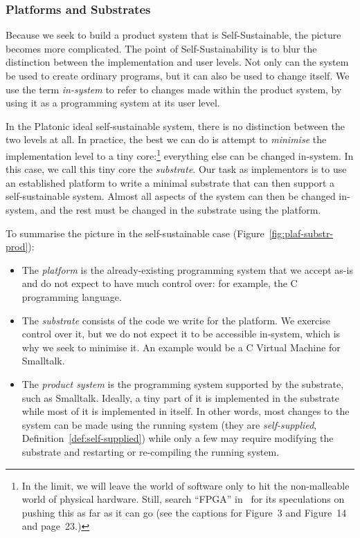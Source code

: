 \documentclass[ twoside,openright,titlepage,numbers=noenddot,headinclude,footinclude,cleardoublepage=empty,abstract=on,
                BCOR=5mm,paper=a4,fontsize=11pt
                ]{scrreprt}
\providecommand{\tightlist}{}\newenvironment{longtable}[2]{\begin{tabular}}{\end{tabular}}
\theoremstyle{definition}
\begin{document}
\hypertarget{platforms-and-substrates}{\subsubsection{Platforms and
Substrates}\label{platforms-and-substrates}}

Because we seek to build a product system that is Self-Sustainable, the
picture becomes more complicated. The point of Self-Sustainability is to
blur the distinction between the implementation and user levels. Not
only can the system be used to create ordinary programs, but it can also
be used to change itself. We use the term \emph{in-system} to refer to
changes made within the product system, by using it as a programming
system at its user level.

In the Platonic ideal self-sustainable system, there is no distinction
between the two levels at all. In practice, the best we can do is
attempt to \emph{minimise} the implementation level to a tiny
core:\footnote{In the limit, we will leave the world of software only to
  hit the non-malleable world of physical hardware. Still, search
  ``FPGA'' in~\parencite{COLAs} for its speculations on pushing this as
  far as it can go (see the captions for Figure~3 and Figure~14 and
  page~23.)} everything else can be changed in-system. In this case, we
call this tiny core the \emph{substrate}. Our task as implementors is to
use an established platform to write a minimal substrate that can then
support a self-sustainable system. Almost all aspects of the system can
then be changed in-system, and the rest must be changed in the substrate
using the platform.

To summarise the picture in the self-sustainable case
(Figure~\ref{fig:plaf-substr-prod}):

\begin{itemize}
\tightlist
\item
  The \emph{platform} is the already-existing programming system that we
  accept as-is and do not expect to have much control over: for example,
  the C programming language.
\item
  The \emph{substrate} consists of the code we write for the platform.
  We exercise control over it, but we do not expect it to be accessible
  in-system, which is why we seek to minimise it. An example would be a
  C Virtual Machine for Smalltalk.
\item
  The \emph{product system} is the programming system supported by the
  substrate, such as Smalltalk. Ideally, a tiny part of it is
  implemented in the substrate while most of it is implemented in
  itself. In other words, most changes to the system can be made using
  the running system (they are \emph{self-supplied},
  Definition~\ref{def:self-supplied}) while only a few may require
  modifying the substrate and restarting or re-compiling the running
  system.
\end{itemize}
\end{document}
